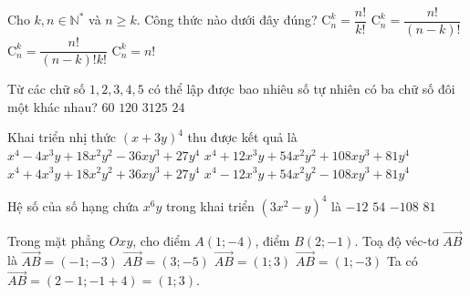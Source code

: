 \begin{ex}%
	Cho $k, n \in \mathbb{N}^*$ và $n \geq k$. Công thức nào dưới đây đúng?
	\choice
	{$\mathrm{C}_n^k=\dfrac{n !}{k !}$}
	{$\mathrm{C}_n^k=\dfrac{n !}{(n-k) !}$}
	{\True $\mathrm{C}_n^k=\dfrac{n !}{(n-k) ! k !}$}
	{$\mathrm{C}_n^k=n!$}
\end{ex}

\begin{ex}%
	Từ các chữ số $1,2,3,4,5$ có thể lập được bao nhiêu số tự nhiên có ba chữ số đôi một khác nhau?
	\choice
	{\True $60$}
	{$120$}
	{$3125$}
	{$24$}
\end{ex}

\begin{ex}%
	Khai triển nhị thức $(x+3y)^4$ thu được kết quả là
	\choice
	{$x^4-4 x^3 y+18 x^2 y^2-36 x y^3+27 y^4$}
	{\True $x^4+12 x^3 y+54 x^2 y^2+108 x y^3+81 y^4$}
	{$x^4+4 x^3 y+18 x^2 y^2+36 x y^3+27 y^4$}
	{$x^4-12 x^3 y+54 x^2 y^2-108 x y^3+81 y^4$}
\end{ex}

\begin{ex}%
	Hệ số của số hạng chứa $x^6y$ trong khai triển $\left(3x^2-y\right)^4$ là
	\choice
	{$-12$}
	{$54$}
	{\True $-108$}
	{$81$}
\end{ex}

\begin{ex}%
	Trong mặt phẳng $Oxy$, cho điểm $A(1;-4)$, điểm $B(2;-1)$. Toạ độ véc-tơ $\vec{AB}$ là
	\choice
	{$\vec{AB}= (-1;-3)$}
	{$\vec{AB}= (3;-5)$}
	{\True $\vec{AB}= (1;3)$}
	{$\vec{AB}= (1;-3)$}
	\loigiai
	{
		Ta có $\vec{AB}= (2-1; -1+4)= (1;3)$.
	}
\end{ex}

